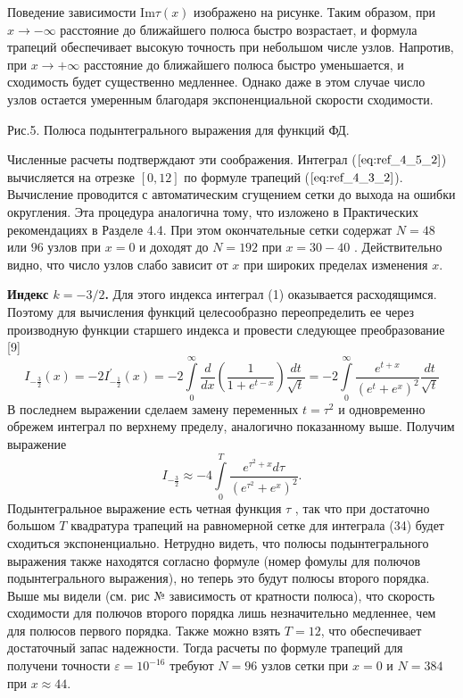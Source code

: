 Поведение зависимости Im$\tau(x)$ изображено на рисунке. %
Таким образом, при $x \to -\infty$ расстояние до ближайшего полюса быстро возрастает, и формула трапеций обеспечивает высокую точность при небольшом числе узлов. Напротив, при $x \to +\infty$ расстояние до ближайшего полюса быстро уменьшается, и сходимость будет существенно медленнее. Однако даже в этом случае число узлов остается умеренным благодаря экспоненциальной скорости сходимости.


Рис.5. Полюса подынтегрального выражения для функций ФД.

Численные расчеты подтверждают эти соображения. Интеграл ($\ref{eq:ref_4_5_2}$)
вычисляется на отрезке $[0,12]$ по формуле трапеций ($\ref{eq:ref_4_3_2}$). Вычисление
проводится с автоматическим сгущением сетки до выхода на ошибки
округления. Эта процедура аналогична тому, что изложено в Практических
рекомендациях в Разделе 4.4. При этом окончательные сетки содержат $N = 48$
или $96$ узлов при $x = 0$ и доходят до $N =192$ при $x=30-40$ . Действительно
видно, что число узлов слабо зависит от $x$ при широких пределах изменения $x$.


\textbf{Индекс $k = -3/2$.} Для этого индекса интеграл (1) оказывается
расходящимся. Поэтому для вычисления функций целесообразно
переопределить ее через производную функции старшего индекса и провести
следующее преобразование [9]
\begin{equation}
I_{-\frac{3}{2}}(x) = -2I_{-\frac{1}{2}}^{'}(x) = -2\int\limits_0^{\infty}\frac{d}{dx}(\frac{1}{1+e^{t-x}})\frac{dt}{\sqrt{t}} = -2\int\limits_0^{\infty}\frac{e^{t+x}}{(e^t+e^x)^2} \frac{dt}{\sqrt{t}}
\label{eq:ref_4_5_8}
\end{equation}
В последнем выражении сделаем замену переменных $t=\tau^2$ и одновременно
обрежем интеграл по верхнему пределу, аналогично показанному выше.
Получим выражение
\begin{equation}
I_{-\frac{3}{2}} \approx -4\int\limits_0^T \frac{e^{\tau^2 + x}d\tau}{(e^{\tau^2}+e^x)^2}.
\label{eq:ref_4_5_9}
\end{equation}
Подынтегральное выражение есть четная функция $\tau$ , так что при достаточно
большом $T$ квадратура трапеций на равномерной сетке для интеграла (34)
будет сходиться экспоненциально. Нетрудно видеть, что полюсы подынтегрального выражения также находятся согласно формуле (номер фомулы для полючов подынтегрального выражения), но теперь это будут полюсы второго порядка. Выше мы видели (см. рис № зависимость от кратности полюса), что скорость сходимости для полючов второго порядка лишь незначительно медленнее, чем для полюсов первого порядка. Также можно взять $T = 12$, что обеспечивает достаточный запас надежности. Тогда расчеты по формуле трапеций для получени точности $\varepsilon = 10^{-16}$ требуют $N = 96$ узлов сетки при $x = 0$ и $N = 384$ при $x \approx 44$.

